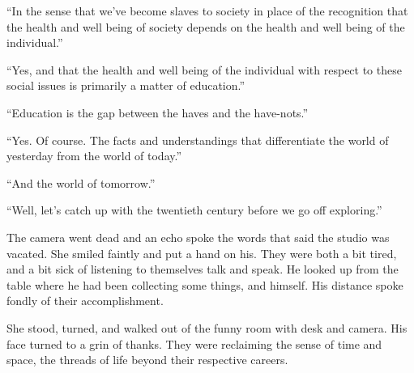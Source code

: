 ``In the sense that we've become slaves to society in place of the
recognition that the health and well being of society depends on the
health and well being of the individual.''

``Yes, and that the health and well being of the individual with
respect to these social issues is primarily a matter of education.''

``Education is the gap between the haves and the have-nots.''

``Yes.  Of course.  The facts and understandings that differentiate
the world of yesterday from the world of today.''

``And the world of tomorrow.''

``Well, let's catch up with the twentieth century before we go off
exploring.''




\vfill
\break


The camera went dead and an echo spoke the words that said the studio
was vacated.  She smiled faintly and put a hand on his.  They were
both a bit tired, and a bit sick of listening to themselves talk and
speak.  He looked up from the table where he had been collecting some
things, and himself.  His distance spoke fondly of their
accomplishment.

She stood, turned, and walked out of the funny room with desk and
camera.  His face turned to a grin of thanks.  They were reclaiming
the sense of time and space, the threads of life beyond their
respective careers.


\vfill
\bye

